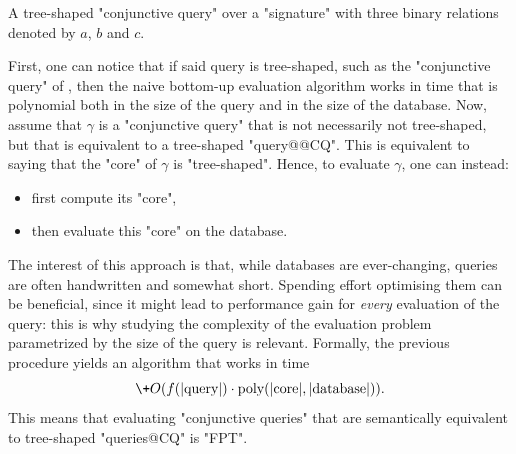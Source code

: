 \begin{marginfigure}
	\centering
	\caption{
		\AP\label{fig:intro-tree-shaped-CQ}
		A tree-shaped "conjunctive query" over a "signature"
		with three binary relations denoted by $a$, $b$ and $c$.
	}
\end{marginfigure}
First, one can notice that if said query is tree-shaped,
such as the "conjunctive query" of , then the naive
bottom-up evaluation algorithm works in time that is polynomial both
in the size of the query and in the size of the database.
Now, assume that $\gamma$ is a "conjunctive query" that is not necessarily
not tree-shaped, but that is equivalent to a tree-shaped "query@@CQ".
This is equivalent to saying that the "core" of $\gamma$ is "tree-shaped".
Hence, to evaluate $\gamma$, one can instead:
\begin{itemize}
	\item first compute its "core",
	\item then evaluate this "core" on the database.
\end{itemize}
The interest of this approach is that, while databases are ever-changing,
queries are often handwritten and somewhat short. Spending effort optimising them can be beneficial, since it might lead to performance gain
for \emph{every} evaluation of the query: this is why studying the
complexity of the evaluation problem parametrized by the size of
the query is relevant.
Formally, the previous procedure yields an algorithm that works in time
\[
	\+O(f(|\text{query}|) \cdot \text{poly}(|\text{core}|, |\text{database}|)).
\]
This means that evaluating "conjunctive queries" that are semantically equivalent to
tree-shaped "queries@CQ" is "FPT".

